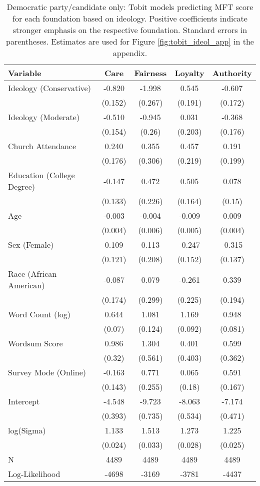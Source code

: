 \begin{table}[ht]
\centering
\caption{Democratic party/candidate only: Tobit models predicting MFT score for each foundation based 
           on ideology. Positive coefficients indicate stronger emphasis on the respective 
           foundation. Standard errors in parentheses. Estimates are used for 
           Figure \ref{fig:tobit_ideol_app} in the appendix.} 
\label{tab:tobit_dem}
\begingroup\footnotesize
\begin{tabular}{lcccc}
  \hline
Variable & Care & Fairness & Loyalty & Authority \\ 
  \hline
Ideology (Conservative) & -0.820 & -1.998 &  0.545 & -0.607 \\ 
   & (0.152) & (0.267) & (0.191) & (0.172) \\ 
  Ideology (Moderate) & -0.510 & -0.945 &  0.031 & -0.368 \\ 
   & (0.154) & (0.26) & (0.203) & (0.176) \\ 
  Church Attendance &  0.240 &  0.355 &  0.457 &  0.191 \\ 
   & (0.176) & (0.306) & (0.219) & (0.199) \\ 
  Education (College Degree) & -0.147 &  0.472 &  0.505 &  0.078 \\ 
   & (0.133) & (0.226) & (0.164) & (0.15) \\ 
  Age & -0.003 & -0.004 & -0.009 &  0.009 \\ 
   & (0.004) & (0.006) & (0.005) & (0.004) \\ 
  Sex (Female) &  0.109 &  0.113 & -0.247 & -0.315 \\ 
   & (0.121) & (0.208) & (0.152) & (0.137) \\ 
  Race (African American) & -0.087 &  0.079 & -0.261 &  0.339 \\ 
   & (0.174) & (0.299) & (0.225) & (0.194) \\ 
  Word Count (log) &  0.644 &  1.081 &  1.169 &  0.948 \\ 
   & (0.07) & (0.124) & (0.092) & (0.081) \\ 
  Wordsum Score &  0.986 &  1.304 &  0.401 &  0.599 \\ 
   & (0.32) & (0.561) & (0.403) & (0.362) \\ 
  Survey Mode (Online) & -0.163 &  0.771 &  0.065 &  0.591 \\ 
   & (0.143) & (0.255) & (0.18) & (0.167) \\ 
  Intercept & -4.548 & -9.723 & -8.063 & -7.174 \\ 
   & (0.393) & (0.735) & (0.534) & (0.471) \\ 
  log(Sigma) &  1.133 &  1.513 &  1.273 &  1.225 \\ 
   & (0.024) & (0.033) & (0.028) & (0.025) \\ 
   \hline
N & 4489 & 4489 & 4489 & 4489 \\ 
  Log-Likelihood & -4698 & -3169 & -3781 & -4437 \\ 
   \hline
\end{tabular}
\endgroup
\end{table}
